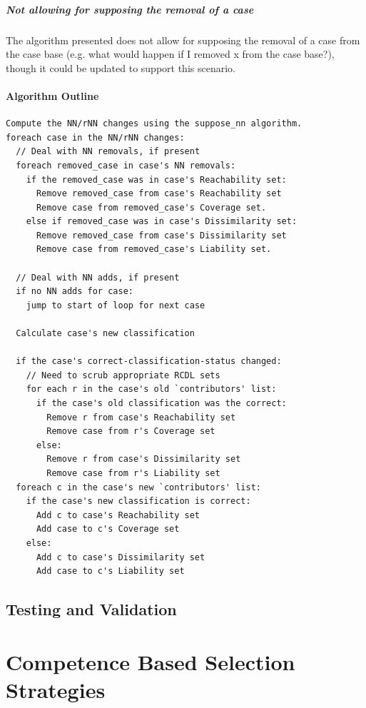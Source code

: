 \documentclass[a4paper,11pt]{report}
\begin{document}
\subparagraph{Not allowing for supposing the removal of a case}
The algorithm presented does not allow for supposing the removal of a case from the case base (e.g. what would happen if I removed x from the case base?), though it could be updated to support this scenario.
 
\paragraph{Algorithm Outline}

\begin{samepage}
{\small 
\begin{verbatim}
Compute the NN/rNN changes using the suppose_nn algorithm.
foreach case in the NN/rNN changes:
  // Deal with NN removals, if present
  foreach removed_case in case's NN removals:
    if the removed_case was in case's Reachability set:
      Remove removed_case from case's Reachability set
      Remove case from removed_case's Coverage set.
    else if removed_case was in case's Dissimilarity set:
      Remove removed_case from case's Dissimilarity set
      Remove case from removed_case's Liability set.

  // Deal with NN adds, if present
  if no NN adds for case:
    jump to start of loop for next case

  Calculate case's new classification
  
  if the case's correct-classification-status changed:
    // Need to scrub appropriate RCDL sets
    for each r in the case's old `contributors' list:
      if the case's old classification was the correct:
        Remove r from case's Reachability set
        Remove case from r's Coverage set
      else:
        Remove r from case's Dissimilarity set
        Remove case from r's Liability set
  foreach c in the case's new `contributors' list:
    if the case's new classification is correct:
      Add c to case's Reachability set
      Add case to c's Coverage set
    else:
      Add c to case's Dissimilarity set
      Add case to c's Liability set

\end{verbatim}
}
\end{samepage}
\subsection{Testing and Validation}

\section{Competence Based Selection Strategies}
\end{document}
